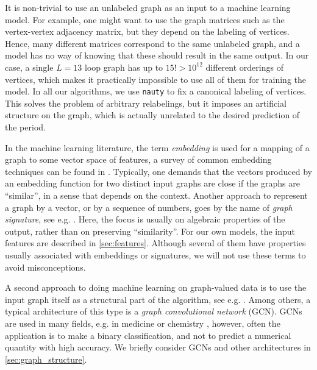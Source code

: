 \documentclass[12pt]{article}
\numberwithin{equation}{section}
\begin{document}
It is non-trivial to use an unlabeled graph as an input to a machine learning model. For example, one might want to use the graph matrices such as the vertex-vertex adjacency matrix, but they depend on the labeling of vertices. Hence, many different matrices correspond to the same unlabeled graph, and a model has no way of knowing that these should result in the same output. In our case,  a single $L=13$ loop graph has up to $15!>10^{12}$ different orderings of vertices, which makes it practically impossible to use all of them for training the model. In all our algorithms, we use  \texttt{nauty} \cite{mckay_practical_2014} to fix a canonical labeling of vertices. This solves the problem of arbitrary relabelings, but it imposes an artificial structure on the graph, which is actually unrelated to the desired prediction of the period. 

In the machine learning literature, the term \emph{embedding} is used for a mapping of a graph to some vector space of features, a survey of common embedding techniques can be found in \cite{yan_graph_2007,goyal_graph_2018,khosla_comparative_2020,cai_comprehensive_2018}. Typically, one demands that the vectors produced by an embedding function for two distinct input graphs are close if the graphs are \enquote{similar}, in a sense that depends on the context. 
Another approach to represent a graph by a vector, or by a sequence of numbers, goes by the name of \emph{graph signature}, see e.g. \cite{toth_capturing_2022,caudillo_signatures_2023}. Here, the focus is usually on algebraic properties of the output, rather than on preserving \enquote{similarity}. For our own models, the input features are described in  \cref{sec:features}.  Although several of them have properties usually associated with embeddings or signatures, we will not use these terms to avoid misconceptions.



A second approach to doing machine learning on graph-valued data is to use the input graph itself as a structural part of the algorithm, see e.g.  \cite{wu_comprehensive_2021,ying_gnnexplainer_2019,bevilacqua_equivariant_2022}. Among others, a typical architecture of this type is a  \emph{graph convolutional network} (GCN). 
GCNs are used in many fields, e.g.  in medicine \cite{ahmedt-aristizabal_survey_2022} or chemistry \cite{kroll_general_2023}, however, often the application is to make a binary classification, and not to predict a numerical quantity with high accuracy. We briefly consider GCNs and other architectures in \cref{sec:graph_structure}.
\end{document}
